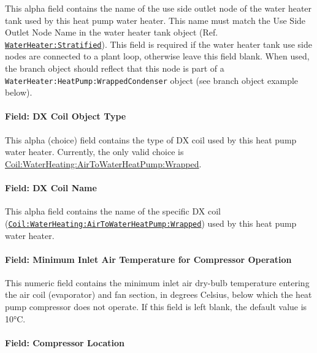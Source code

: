 This alpha field contains the name of the use side outlet node of the water heater tank used by this heat pump water heater. This name must match the Use Side Outlet Node Name in the water heater tank object (Ref. \hyperref[waterheaterstratified]{\lstinline!WaterHeater:Stratified!}). This field is required if the water heater tank use side nodes are connected to a plant loop, otherwise leave this field blank. When used, the branch object should reflect that this node is part of a \lstinline!WaterHeater:HeatPump:WrappedCondenser! object (see branch object example below).

\paragraph{Field: DX Coil Object Type}\label{field-dx-coil-object-type-1}

This alpha (choice) field contains the type of DX coil used by this heat pump water heater. Currently, the only valid choice is \hyperref[coilwaterheatingairtowaterheatpumpwrapped]{Coil:WaterHeating:AirToWaterHeatPump:Wrapped}.

\paragraph{Field: DX Coil Name}\label{field-dx-coil-name-1}

This alpha field contains the name of the specific DX coil (\hyperref[coilwaterheatingairtowaterheatpumpwrapped]{\lstinline!Coil:WaterHeating:AirToWaterHeatPump:Wrapped!}) used by this heat pump water heater.

\paragraph{Field: Minimum Inlet Air Temperature for Compressor Operation}\label{field-minimum-inlet-air-temperature-for-compressor-operation-1}

This numeric field contains the minimum inlet air dry-bulb temperature entering the air coil (evaporator) and fan section, in degrees Celsius, below which the heat pump compressor does not operate. If this field is left blank, the default value is 10°C.

\paragraph{Field: Compressor Location}\label{field-compressor-location-1}

